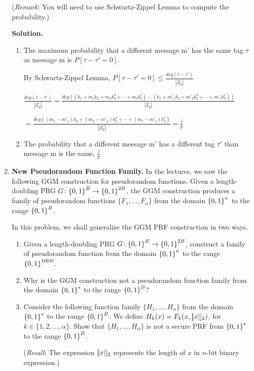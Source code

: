 \documentclass[11pt]{article}
\newcommand{\nextoddpage}{\checkoddpage\ifoddpage{\ \newpage\ \newpage}\else{\ \newpage}\fi}
\begin{document}
\begin{enumerate}
  ({\footnotesize {\em Remark}: You will need to use Schwartz-Zippel Lemma to compute the probability.}) 
  
  {\bfseries Solution.} 
  \begin{enumerate}
  \item The maximum probability that a different message m' has the same tag $\tau$ as message m is $P[\tau - \tau' = 0]$.
  
  	By Schwartz-Zippel Lemma, $P[\tau - \tau' = 0] \leq \frac{deg(\tau - \tau')}{|Z_p|}$
  	
  	$\frac{deg(\tau - \tau')}{|Z_p|} = \frac{deg((k_1 + m_1k_2 + m_2k_2^2 + \dotsi + m_\ell k_2^\ell) - (k_1 + m'_1k_2 + m'_2k_2^2 + \dotsi + m'_\ell k_2^\ell))}{|Z_p|}$
  	
  	$ = \frac{deg((m_1-m'_1)k_2 + (m_2-m'_2)k_2^2 + \dotsi + (m_\ell-m'_\ell) k_2^\ell)}{|Z_p|} = \frac{l}{p}$
  \item The probability that a different message m' has a different tag $\tau'$ than message m is the same, $\frac{l}{p}$
  \end{enumerate} 
   
  


\nextoddpage 
\item {\bfseries New Pseudorandom Function Family.} 
  In the lectures, we saw the following GGM construction for pseudorandom functions. 
  Given a length-doubling PRG $G\colon{\{0,1\}}^B\to{\{0,1\}}^{2B}$, the GGM construction produces a family of pseudorandom functions $\{F_1,\dotsc,F_\alpha\}$ from the domain ${\{0,1\}}^n$ to the range ${\{0,1\}}^{B}$. 
  
  In this problem, we shall generalize the GGM PRF construction in two ways. 
  \begin{enumerate}
  \item Given a length-doubling PRG $G\colon{\{0,1\}}^B\to{\{0,1\}}^{2B}$, construct a family of pseudorandom function from the domain ${\{0,1\}}^n$ to the range ${\{0,1\}}^{100B}$. 
  \item Why is the GGM construction not a pseudorandom function family from the domain ${\{0,1\}}^*$ to the range ${\{0,1\}}^B$? 
  \item Consider the following function family $\{H_1,\dotsc,H_\alpha\}$ from the domain ${\{0,1\}}^*$ to the range ${\{0,1\}}^B$. 
    We define $H_k(x) = F_k(x , [\abs x]_2)$, for $k\in\{1,2,\dotsc,\alpha\}$. 
    Show that $\{H_1,\dotsc,H_\alpha\}$ is not a secure PRF from ${\{0,1\}}^*$ to the range ${\{0,1\}}^B$. 
    
    ({\footnotesize {\em Recall}: The expression $[\abs x]_2$ represents the length of $x$ in $n$-bit binary expression.}) 
  \end{enumerate}
  

\end{enumerate}
\end{document}
